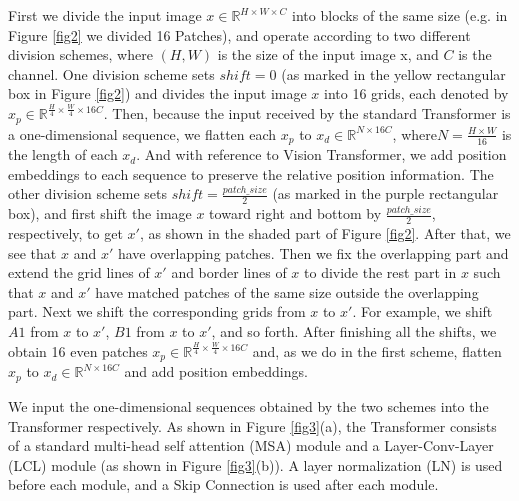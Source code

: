 \documentclass[lettersize,journal]{IEEEtran}
\begin{document}
First we divide the input image $x \in \mathbb{R}^{H\times W \times C}$ into blocks of the same size (e.g. in Figure \ref{fig2} we divided 16 Patches), and operate according to two different division schemes, where $(H, W)$ is the size of the input image x, and $C$ is the channel. One division scheme sets $shift=0$ (as marked in the yellow rectangular box in Figure \ref{fig2}) and divides the input image $x$ into 16 grids, each denoted by $x_p \in \mathbb{R}^{\frac{H}{4}\times \frac{W}{4} \times 16C}$. Then, because the input received by the standard Transformer is a one-dimensional sequence, we flatten each $x_p$ to $x_d \in \mathbb{R}^{N \times 16C}$, where$N = \frac{H\times W}{16}$ is the length of each $x_d$. And with reference to Vision Transformer, we add position embeddings to each sequence to preserve the relative position information. The other division scheme sets $shift=\frac{patch\_size}{2}$ (as marked in the purple rectangular box), and first shift the image $x$ toward right and bottom by $\frac{patch\_size}{2}$, respectively, to get $x'$, as shown in the shaded part of Figure \ref{fig2}. After that, we see that $x$ and $x'$ have overlapping patches. Then we fix the overlapping part and extend the grid lines of $x'$ and border lines of $x$ to divide the rest part in $x$ such that $x$ and $x'$ have matched patches of the same size outside the overlapping part. Next we shift  the corresponding grids from $x$ to $x'$. For example, we shift $A1$ from $x$ to $x'$, $B1$ from $x$ to $x'$, and so forth. After finishing all the shifts, we obtain 16 even patches $x_p \in \mathbb{R}^{\frac{H}{4}\times \frac{W}{4} \times 16C}$ and, as we do in the first scheme, flatten $x_p$ to $x_d \in  \mathbb{R}^{N \times 16C}$ and add position embeddings.

We input the one-dimensional sequences obtained by the two schemes into the Transformer respectively. As shown in Figure \ref{fig3}(a), the Transformer consists of a standard multi-head self attention (MSA) module and a Layer-Conv-Layer (LCL) module (as shown in Figure \ref{fig3}(b)). A layer normalization (LN)\cite{ba2016layer} is used before each module, and a Skip Connection is used after each module.
\end{document}
